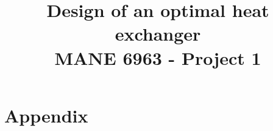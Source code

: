 \documentclass[11pt]{article}
\title{Design of an optimal heat exchanger\\MANE 6963 - Project 1}
\author{}
\date{}
\begin{document}
\maketitle

\section{Appendix}
\end{document}
